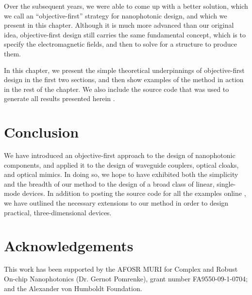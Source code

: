 Over the subsequent years, we were able to come up with a better solution,
    which we call an ``objective-first'' strategy for nanophotonic design,
    and which we present in this chapter.
Although it is much more advanced than our original idea,
    objective-first design still carries the same fundamental concept,
    which is to specify the electromagnetic fields, and then
    to solve for a structure to produce them.
    
In this chapter, we present the simple theoretical underpinnings of 
    objective-first design in the first two sections,
    and then show examples of the method in action in the rest of the chapter.
We also include the source code that was used to generate
    all results presented herein \cite{code}.
    








\section{Conclusion}
We have introduced an objective-first approach
    to the design of nanophotonic components, and
    applied it to the design of waveguide couplers,
    optical cloaks, and optical mimics.
In doing so, we hope to have exhibited both the simplicity
    and the breadth of our method to the design of a broad
    class of linear, single-mode devices.
In addition to posting the source code for all the examples online \cite{code}, 
    we have outlined the necessary extensions to our method in order
    to design practical, three-dimensional devices.

\section{Acknowledgements}
This work has been supported by the 
    AFOSR MURI for Complex and Robust On-chip Nanophotonics 
    (Dr. Gernot Pomrenke), grant number FA9550-09-1-0704; 
    and the Alexander von Humboldt Foundation.


